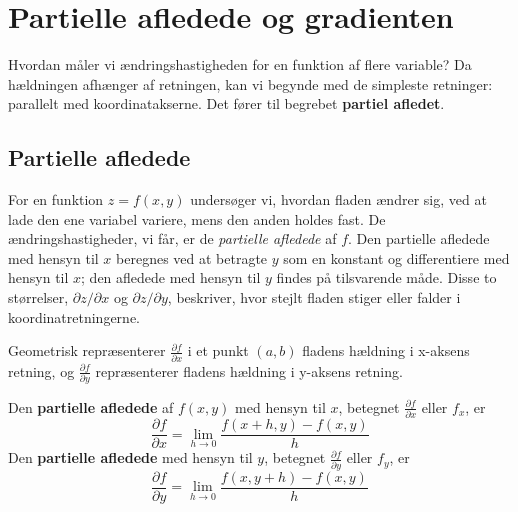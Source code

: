 \section{Partielle afledede og gradienten}
Hvordan måler vi ændringshastigheden for en funktion af flere variable? Da hældningen afhænger af retningen, kan vi begynde med de simpleste retninger: parallelt med koordinatakserne. Det fører til begrebet \textbf{partiel afledet}.

\subsection*{Partielle afledede}

For en funktion \(z = f(x,y)\) undersøger vi, hvordan fladen ændrer sig, ved at lade den ene variabel variere, mens den anden holdes fast. De ændringshastigheder, vi får, er de \emph{partielle afledede} af \(f\). Den partielle afledede med hensyn til \(x\) beregnes ved at betragte \(y\) som en konstant og differentiere med hensyn til \(x\); den afledede med hensyn til \(y\) findes på tilsvarende måde. Disse to størrelser, \(\partial z/\partial x\) og \(\partial z/\partial y\), beskriver, hvor stejlt fladen stiger eller falder i koordinatretningerne.

Geometrisk repræsenterer \( \frac{\partial f}{\partial x} \) i et punkt \((a, b)\) fladens hældning i x-aksens retning, og \( \frac{\partial f}{\partial y} \) repræsenterer fladens hældning i y-aksens retning.


\begin{definition}
Den \textbf{partielle afledede} af \( f(x, y) \) med hensyn til \( x \), betegnet \( \frac{\partial f}{\partial x} \) eller \( f_x \), er
$$
\frac{\partial f}{\partial x} = \lim_{h \to 0} \frac{f(x+h, y) - f(x, y)}{h}
$$
Den \textbf{partielle afledede} med hensyn til \( y \), betegnet \( \frac{\partial f}{\partial y} \) eller \( f_y \), er
$$
\frac{\partial f}{\partial y} = \lim_{h \to 0} \frac{f(x, y+h) - f(x, y)}{h}
$$
\end{definition}

